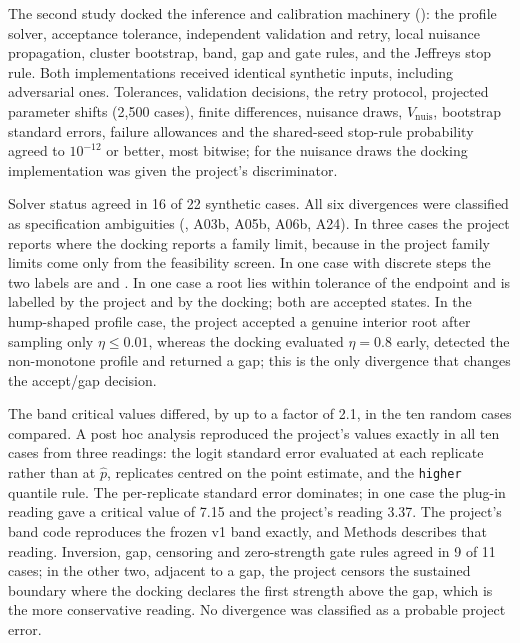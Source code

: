 The second study docked the inference and calibration machinery (): the profile solver, acceptance tolerance, independent validation and retry, local nuisance propagation, cluster bootstrap, band, gap and gate rules, and the Jeffreys stop rule. Both implementations received identical synthetic inputs, including adversarial ones. Tolerances, validation decisions, the retry protocol, projected parameter shifts (2,500 cases), finite differences, nuisance draws, $V_{\mathrm{nuis}}$, bootstrap standard errors, failure allowances and the shared-seed stop-rule probability agreed to $10^{-12}$ or better, most bitwise; for the nuisance draws the docking implementation was given the project's discriminator.

Solver status agreed in 16 of 22 synthetic cases. All six divergences were classified as specification ambiguities (, A03b, A05b, A06b, A24). In three cases the project reports  where the docking reports a family limit, because in the project family limits come only from the feasibility screen. In one case with discrete steps the two labels are  and . In one case a root lies within tolerance of the endpoint and is labelled  by the project and  by the docking; both are accepted states. In the hump-shaped profile case, the project accepted a genuine interior root after sampling only $\eta\leq0.01$, whereas the docking evaluated $\eta=0.8$ early, detected the non-monotone profile and returned a gap; this is the only divergence that changes the accept/gap decision.

The band critical values differed, by up to a factor of 2.1, in the ten random cases compared. A post hoc analysis reproduced the project's values exactly in all ten cases from three readings: the logit standard error evaluated at each replicate rather than at $\hat p$, replicates centred on the point estimate, and the \texttt{higher} quantile rule. The per-replicate standard error dominates; in one case the plug-in reading gave a critical value of 7.15 and the project's reading 3.37. The project's band code reproduces the frozen v1 band exactly, and Methods describes that reading. Inversion, gap, censoring and zero-strength gate rules agreed in 9 of 11 cases; in the other two, adjacent to a gap, the project censors the sustained boundary where the docking declares the first strength above the gap, which is the more conservative reading. No divergence was classified as a probable project error.

